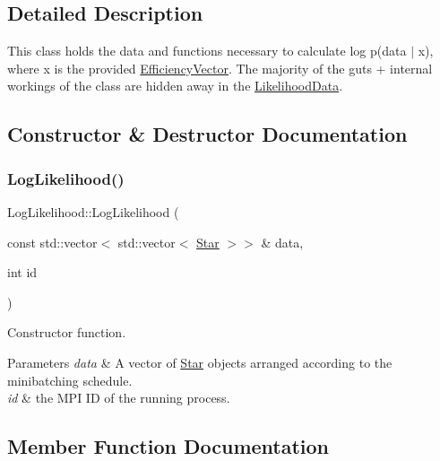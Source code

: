 \subsection{Detailed Description}
This class holds the data and functions necessary to calculate log p(data $\vert$ x), where x is the provided \hyperlink{classEfficiencyVector}{Efficiency\+Vector}. The majority of the guts + internal workings of the class are hidden away in the \hyperlink{classLikelihoodData}{Likelihood\+Data}. 

\subsection{Constructor \& Destructor Documentation}
\mbox{\label{classLogLikelihood_a677cb07d3097385392fe49944e522858}} 
\subsubsection{\texorpdfstring{Log\+Likelihood()}{LogLikelihood()}}
{\footnotesize\ttfamily Log\+Likelihood\+::\+Log\+Likelihood (\begin{DoxyParamCaption}\item[{const std\+::vector$<$ std\+::vector$<$ \hyperlink{classStar}{Star} $>$$>$ \&}]{data,  }\item[{int}]{id }\end{DoxyParamCaption})}



Constructor function. 


\begin{DoxyParams}{Parameters}
{\em data} & A vector of \hyperlink{classStar}{Star} objects arranged according to the minibatching schedule. \\
\hline
{\em id} & the M\+PI ID of the running process. \\
\hline
\end{DoxyParams}


\subsection{Member Function Documentation}
\mbox{\label{classLogLikelihood_a748d75e2eb89965246436eb6a9274004}} 
